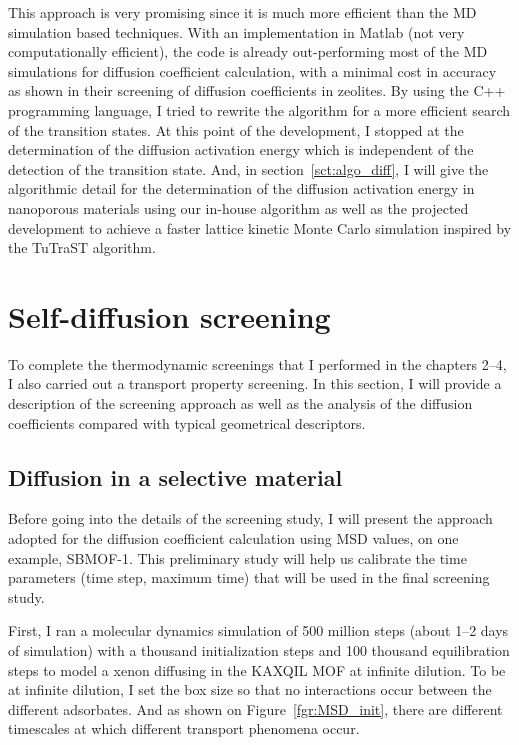 \documentclass[main]{subfiles}
\begin{document}
This approach is very promising since it is much more efficient than the MD simulation based techniques. With an implementation in Matlab (not very computationally efficient), the code is already out-performing most of the MD simulations for diffusion coefficient calculation, with a minimal cost in accuracy as shown in their screening of diffusion coefficients in zeolites. By using the C++ programming language, I tried to rewrite the algorithm for a more efficient search of the transition states. At this point of the development, I stopped at the determination of the diffusion activation energy which is independent of the detection of the transition state. And, in section~\ref{sct:algo_diff}, I will give the algorithmic detail for the determination of the diffusion activation energy in nanoporous materials using our in-house algorithm as well as the projected development to achieve a faster lattice kinetic Monte Carlo simulation inspired by the TuTraST algorithm.


\section{Self-diffusion screening}\label{sct:md_screening}

To complete the thermodynamic screenings that I performed in the chapters 2--4, I also carried out a transport property screening. In this section, I will provide a description of the screening approach as well as the analysis of the diffusion coefficients compared with typical geometrical descriptors.

\subsection{Diffusion in a selective material}

Before going into the details of the screening study, I will present the approach adopted for the diffusion coefficient calculation using MSD values, on one example, SBMOF-1\autocite{Banerjee_2016}. This preliminary study will help us calibrate the time parameters (time step, maximum time) that will be used in the final screening study.

First, I ran a molecular dynamics simulation of 500 million steps (about 1--2 days of simulation) with a thousand initialization steps and 100 thousand equilibration steps to model a xenon diffusing in the KAXQIL\autocite{Banerjee2012} MOF at infinite dilution. To be at infinite dilution, I set the box size so that no interactions occur between the different adsorbates. And as shown on Figure~\ref{fgr:MSD_init}, there are different timescales at which different transport phenomena occur. 
\end{document}

